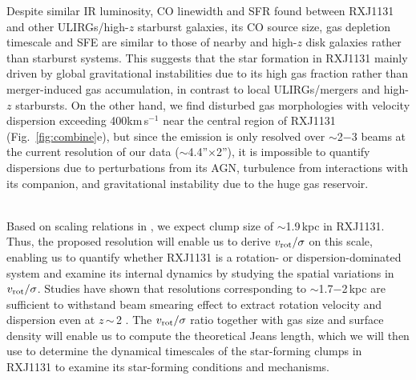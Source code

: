 \documentclass[11pt,a4paper,twoside,graphicx,color]{article}
\newcommand{\vs}{$v_{\rm rot}/\sigma$\xspace}
\newcommand{\kms}{km\,s$^{-1}$\xspace}
\newcommand{\Fig}[1]{Fig.~\ref{fig:#1}}
\newcommand{\ssim}{\,$\sim$\,}
\newcommand{\SF}{star formation\xspace}
\newcommand{\SB}{starburst\xspace}
\newcommand{\highz}{high-$z$\xspace}
\begin{document}
Despite similar IR luminosity, CO linewidth and SFR found between RXJ1131
and other ULIRGs/high-$z$ \SB galaxies, 
its CO source size, gas depletion timescale and SFE are similar to those 
of nearby and high-$z$ disk galaxies rather than \SB systems. This suggests that
the \SF in RXJ1131 
mainly driven by
global gravitational instabilities due to its high gas fraction
rather than merger-induced gas accumulation, 
in contrast to local ULIRGs/mergers and \highz starbursts. 
On the other hand, we find disturbed gas morphologies with velocity dispersion exceeding 
400\kms near the central region of RXJ1131 (\Fig{combine}e), but since
the emission is only resolved over $\sim$2$-$3 beams at the current resolution of our data ($\sim$4.4''$\times$2''),
it is impossible to quantify dispersions due to 
perturbations from its AGN,
turbulence from interactions with its companion, 
and gravitational instability due to the huge gas reservoir. %

\vspace{0.3em}
 \\ %
\indent 
Based on scaling relations 
in \citet{Genzel11a}, %
we expect clump size of %
$\sim$1.9\,kpc in RXJ1131. %
Thus, the proposed resolution will enable us to derive \vs
on this scale, enabling us to quantify whether RXJ1131 is a rotation- or dispersion-dominated system 
and examine its internal dynamics by studying the spatial variations in \vs.
Studies have shown that resolutions corresponding to $\sim$1.7$-$2\,kpc are sufficient to withstand %
beam smearing effect %
to extract rotation velocity and 
dispersion 
even at $z$\ssim2  \citep{Newman13a, Genzel14a}.
The \vs ratio together with gas size and surface density will enable us to compute the theoretical Jeans length, 
which we will then use to determine the dynamical timescales of the star-forming clumps in RXJ1131
to examine its star-forming conditions and mechanisms.
\end{document}
